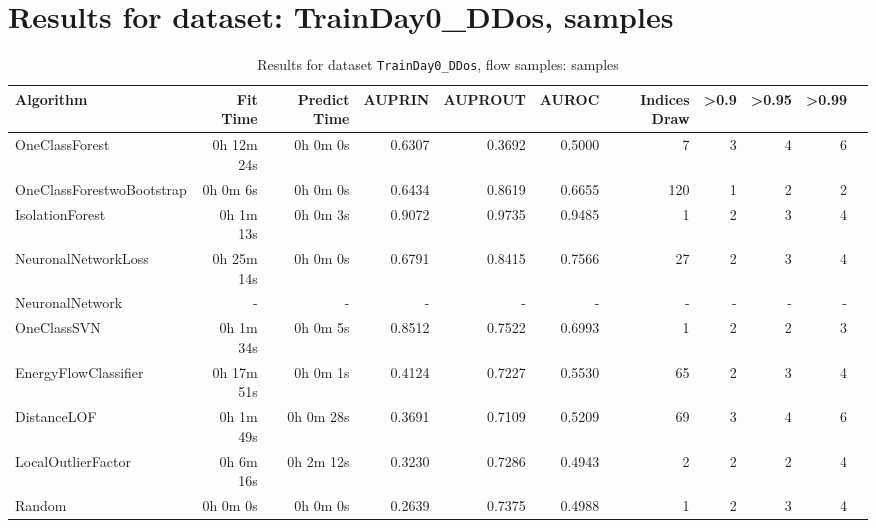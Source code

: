 \documentclass{article}
\begin{document}
\section*{Results for dataset: TrainDay0_DDos, samples}
\begin{table}[h!]
\centering
\caption{Results for dataset \texttt{TrainDay0_DDos}, flow samples: samples}
\label{tab:trainday0ddos_samples}
\begin{tabular}{lrrrrrrrrrr}
\toprule
Algorithm & Fit Time & Predict Time & AUPRIN & AUPROUT & AUROC & Indices Draw & >0.9 & >0.95 & >0.99 \\
\midrule
OneClassForest & 0h 12m 24s & 0h 0m 0s & 0.6307 & 0.3692 & 0.5000 & 7 & 3 & 4 & 6 \\
OneClassForestwoBootstrap & 0h 0m 6s & 0h 0m 0s & 0.6434 & 0.8619 & 0.6655 & 120 & 1 & 2 & 2 \\
IsolationForest & 0h 1m 13s & 0h 0m 3s & 0.9072 & 0.9735 & 0.9485 & 1 & 2 & 3 & 4 \\
NeuronalNetworkLoss & 0h 25m 14s & 0h 0m 0s & 0.6791 & 0.8415 & 0.7566 & 27 & 2 & 3 & 4 \\
NeuronalNetwork & - & - & - & - & - & - & - & - & - \\
OneClassSVN & 0h 1m 34s & 0h 0m 5s & 0.8512 & 0.7522 & 0.6993 & 1 & 2 & 2 & 3 \\
EnergyFlowClassifier & 0h 17m 51s & 0h 0m 1s & 0.4124 & 0.7227 & 0.5530 & 65 & 2 & 3 & 4 \\
DistanceLOF & 0h 1m 49s & 0h 0m 28s & 0.3691 & 0.7109 & 0.5209 & 69 & 3 & 4 & 6 \\
LocalOutlierFactor & 0h 6m 16s & 0h 2m 12s & 0.3230 & 0.7286 & 0.4943 & 2 & 2 & 2 & 4 \\
Random & 0h 0m 0s & 0h 0m 0s & 0.2639 & 0.7375 & 0.4988 & 1 & 2 & 3 & 4 \\
\bottomrule
\end{tabular}
\end{table}
\end{document}
